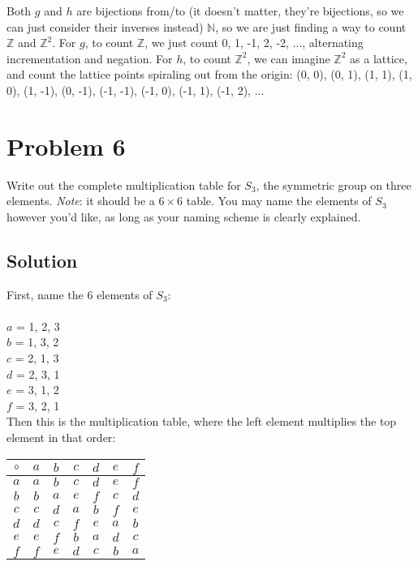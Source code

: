 \documentclass[fleqn]{article}
\begin{document}
        Both $g$ and $h$ are bijections from/to (it doesn't matter, they're bijections, so we can just consider their inverses instead) $\mathbb{N}$, so we are just finding a way to count $\mathbb{Z}$ and $\mathbb{Z}^2$.  For $g$, to count $\mathbb{Z}$, we just count 0, 1, -1, 2, -2, ..., alternating incrementation and negation.  For $h$, to count $\mathbb{Z}^2$, we can imagine $\mathbb{Z}^2$ as a lattice, and count the lattice points spiraling out from the origin: (0, 0), (0, 1), (1, 1), (1, 0), (1, -1), (0, -1), (-1, -1), (-1, 0), (-1, 1), (-1, 2), ...
        
    \pagebreak
    
    \section{Problem 6}
    Write out the complete multiplication table for $S_3$, the symmetric group on three elements.  \textit{Note}: it should be a $6 \times 6$ table.  You may name the elements of $S_3$ however you'd like, as long as your naming scheme is clearly explained.
        
        \subsection{Solution}
        First, name the 6 elements of $S_3$: \\ \\
        \noindent
        \indent $a$ = 1, 2, 3 \\
        \indent $b$ = 1, 3, 2 \\
        \indent $c$ = 2, 1, 3 \\
        \indent $d$ = 2, 3, 1 \\
        \indent $e$ = 3, 1, 2 \\
        \indent $f$ = 3, 2, 1 \\
        
        \noindent
        Then this is the multiplication table, where the left element multiplies the top element in that order: \\
        
        \begin{tabular}{ c|c|c|c|c|c|c| } 
            $\circ$ & $a$ & $b$ & $c$ & $d$ & $e$ & $f$ \\ \hline 
            $a$ & $a$ & $b$ & $c$ & $d$ & $e$ & $f$ \\ \hline 
            $b$ & $b$ & $a$ & $e$ & $f$ & $c$ & $d$ \\ \hline 
            $c$ & $c$ & $d$ & $a$ & $b$ & $f$ & $e$ \\ \hline 
            $d$ & $d$ & $c$ & $f$ & $e$ & $a$ & $b$ \\ \hline 
            $e$ & $e$ & $f$ & $b$ & $a$ & $d$ & $c$ \\ \hline 
            $f$ & $f$ & $e$ & $d$ & $c$ & $b$ & $a$ \\ \hline
        \end{tabular}
        
\end{document}
